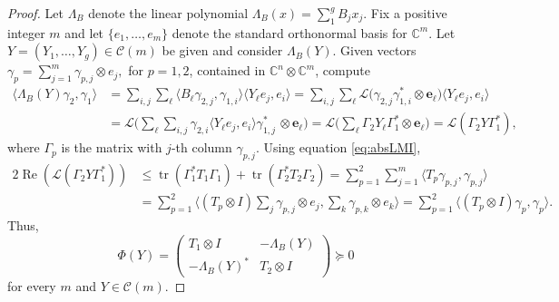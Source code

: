 \documentclass[12pt,makeidx]{amsart}
\DeclareMathOperator{\tr}{tr}
\numberwithin{equation}{section}
\def\bbF{ {\mathbb C}}
\def\cC{ {\mathcal C} }
\def\cL{ {\mathcal L} }
\def\La{\Lambda}
\def\be{\mathbf{e}}
\begin{document}
\begin{proof}
 Let $\Lambda_B$ denote the linear polynomial  $\Lambda_B(x)=\sum_1^g B_j x_j$.
 Fix a positive integer $m$ and let 
 $\{e_1,\dots,e_m\}$ denote the standard orthonormal basis for
  $\bbF^m$. 
 Let $Y=(Y_1,\dots,Y_g)\in\cC(m)$ be given and consider
  $\La_B(Y)$.
 Given vectors 
 $\gamma_p=\sum_{j=1}^m  \gamma_{p,j} \otimes e_j,$ for $p=1,2$,
 contained in $\bbF^n\otimes \bbF^m$, compute
\[
 \begin{split}
 \langle \Lambda_B(Y)\gamma_2,\gamma_1 \rangle
  & = \sum_{i,j}\sum_\ell \langle  B_\ell\gamma_{2,j},
           \gamma_{1,i}\rangle \langle Y_\ell e_j,e_i\rangle 
  =  \sum_{i,j} \sum_\ell \cL \big( \gamma_{2,j} \gamma_{1,i}^{\ast} \otimes \be_\ell \big)
                \langle Y_\ell e_j,e_i\rangle  \\
  & =  \cL \big( \sum_{\ell}  \sum_{i,j} \gamma_{2,i} \langle Y_\ell e_j,e_i\rangle \gamma_{1,j}^\ast \, 
            \otimes \be_\ell \big) 
  =   \cL \big( \sum_{\ell} \Gamma_2 Y_\ell \Gamma_1^{\ast}\otimes \be_\ell \big) 
   =  \cL(\Gamma_2  Y \Gamma_1^{\ast}),
 \end{split}
\]
 where  $\Gamma_p$ is the matrix with $j$-th column $\gamma_{p,j}$. 
 Using equation \eqref{eq:absLMI},
\[
 \begin{split}
 2 \operatorname{Re}(\cL(\Gamma_2 Y \Gamma_1^{\ast})) & \le  \tr(\Gamma_1^{\ast} T_1 \Gamma_1) +\tr(\Gamma_2^* T_2 \Gamma_2)  
  =  \sum_{p=1}^2 \sum_{j=1}^m \langle T_p \gamma_{p,j},\gamma_{p,j} \rangle  \\
   &= \sum_{p=1}^2  \langle (T_p\otimes I) \sum_j \gamma_{p,j}\otimes e_j,
       \sum_k \gamma_{p,k} \otimes e_k \rangle 
   = \sum_{p=1}^2 \langle (T_p\otimes I) \gamma_p,\gamma_p\rangle.
 \end{split}
\] 
 Thus, 
\begin{equation}
\label{eq:Tlmi}
 \Phi(Y) =\begin{pmatrix} T_1\otimes I & -\Lambda_B(Y) \\ -\Lambda_B(Y)^* & T_2\otimes I \end{pmatrix} \succeq 0
 \end{equation}
 for every $m$ and $Y\in\cC(m)$.



\end{proof}
\end{document}
